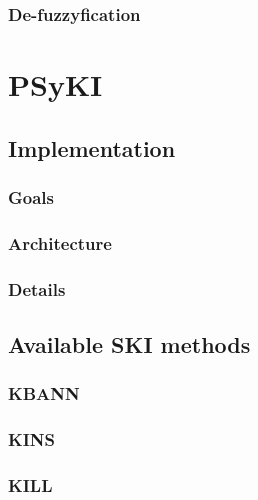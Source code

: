 \documentclass[12pt,a4paper,openright,twoside]{book}
\begin{document}
\subsection{De-fuzzyfication}\label{subsec:unfuzzyfication}


\chapter{\Acl{PSyKI}}\label{ch:psyki}

\section{Implementation}\label{sec:implementation}

\subsection{Goals}\label{subsec:goals}

\subsection{Architecture}\label{subsec:architecture}

\subsection{Details}\label{subsec:details}

\section{Available \ac{SKI} methods}\label{sec:available-ski-methods}

\subsection{\Acl{KBANN}}\label{subsec:kbann}

\subsection{\Acl{KINS}}\label{subsec:kins}

\subsection{\Acl{KILL}}\label{subsec:kill}
\end{document}
